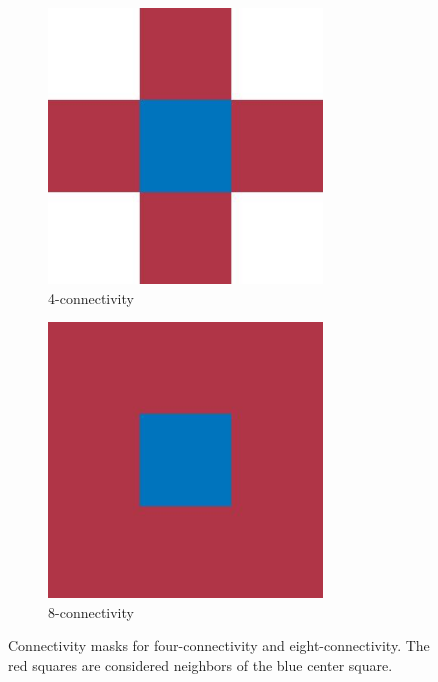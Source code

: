 \begin{figure}
	\centering
	\begin{subfigure}{0.45\columnwidth}
		\centering
		\includegraphics[width=0.8\textwidth]{./img/exp_mask_four.jpg}
		\caption{4-connectivity}
		\label{fig:exp:connectivity:fourMask}
	\end{subfigure}
	\begin{subfigure}{0.45\columnwidth}
		\centering
		\includegraphics[width=0.8\textwidth]{./img/exp_mask_eight.jpg}
		\caption{8-connectivity}
		\label{fig:exp:connectivity:eightMask}
	\end{subfigure}	
	\caption{Connectivity masks for  four-connectivity and  eight-connectivity. The red squares are considered neighbors of the blue center square.}
	\label{fig:exp:connectivity}
\end{figure}

